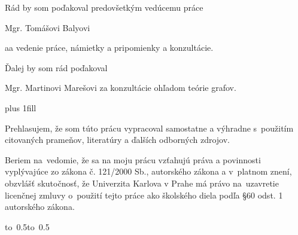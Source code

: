 \documentclass[12pt,a4paper]{report}
\let\openright=\clearpage
\begin{document}
\openright

\noindent

\begin{center}

\vspace{50mm}
Rád by som poďakoval predovšetkým vedúcemu práce

\vspace{5mm}
Mgr. Tomášovi Balyovi
\vspace{5mm}

aa vedenie práce, námietky a pripomienky a konzultácie.


\vspace{30mm}
Ďalej by som rád poďakoval 

\vspace{5mm}
Mgr. Martinovi Marešovi 
\vspace{5mm}
za konzultácie ohľadom teórie grafov.
\end{center}



\newpage


\vglue 0pt plus 1fill

\noindent
Prehlasujem, že som túto prácu vypracoval samostatne a výhradne
s~použitím citovaných prameňov, literatúry a ďalších
odborných zdrojov.


\medskip\noindent
Beriem na~vedomie, že sa na moju prácu vzťahujú práva
a povinnosti vyplývajúce zo zákona  č. 121/2000 Sb.,
autorského zákona a v~platnom znení, obzvlášť skutočnosť,
že Univerzita Karlova v Prahe má právo na~uzavretie licenčnej zmluvy o~použití tejto práce ako školského diela podľa
§60 odst. 1 autorského zákona.

\vspace{10mm}

\hbox{\hbox to 0.5\hbox to 0.5}

\vspace{20mm}
\newpage

\end{document}
